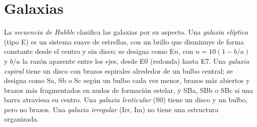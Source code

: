 \section{Galaxias}\label{sec:b3:milky-way-galaxies:galaxies}

\begin{definition}\label{def:b3:milky-way-galaxies:types}
La \emph{secuencia de Hubble} clasifica las galaxias por
su aspecto. Una \emph{galaxia elíptica}
(tipo E) es un sistema suave de estrellas, con un brillo que disminuye de forma constante desde
el centro y sin disco; se designa como E$n$, con $n = 10(1 - b/a)$
y $b/a$ la razón aparente entre los ejes, desde E0 (redonda) hasta E7. Una
\emph{galaxia espiral} tiene un disco con brazos espirales
alrededor de un bulbo central; se designa como Sa, Sb o Sc según un bulbo cada vez menor,
brazos más abiertos y brazos más fragmentados en nudos de formación estelar, y
SBa, SBb o SBc si una barra atraviesa su centro. Una \emph{galaxia
lenticular} (S0) tiene un disco y un bulbo, pero no brazos.
Una \emph{galaxia irregular} (Irr, Im) no tiene
una estructura organizada.
\end{definition}

